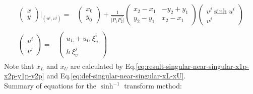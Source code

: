 \documentclass [10pt,letterpaper]{article}
\begin{document}
\begin{subequations} \label{eq:singular-near-singular-x-y-ui-vj}
	\begin{align} 
		\begin{split} 
			\begin{pmatrix} 
				x					\\
				y
			\end{pmatrix}
			\bigg\vert _{ (u^i,v^j) }
			=& 
			\begin{pmatrix}
				x_0					\\
				y_0
			\end{pmatrix}
			+
			\frac{1}{\lvert \overrightarrow{P_1 P_2} \rvert}
			\begin{pmatrix} 
				x_2-x_1 	& 	-y_2+y_1	\\
				y_2-y_1 	& 	x_2-x_1		
			\end{pmatrix}
			\begin{pmatrix}
				v^j \sinh{u^i}				\\
				v^j
			\end{pmatrix}
		\end{split}
		\\
		\begin{split} 
			\begin{pmatrix}
				u^i					\\
				v^j
			\end{pmatrix}
			=&
			\begin{pmatrix}
				u_L
				+ 
				u_U
				\ \xi_u^i				\\
				h
				\ \xi_v^j
			\end{pmatrix}
		\end{split}
	\end{align}
\end{subequations}
Note that $x_L$ and $x_U$ are calculated
by Eq.\eqref{eq:result-singular-near-singular-x1p-x2p-y1p-y2p}
and Eq.\eqref{eq:def-singular-near-singular-xL-xU}.  
\\
Summary of equations for the $\sinh^{-1}$ transform method:
\end{document}
